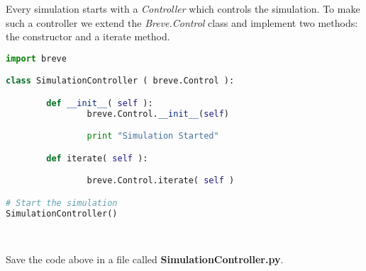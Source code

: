 
Every simulation starts with a \textit{Controller} which controls the simulation. To make such a controller we extend the \textit{Breve.Control} class and implement two methods: the constructor and a iterate method.

\begin{lstlisting}[language=Python]
import breve

class SimulationController ( breve.Control ):

        def __init__( self ):
                breve.Control.__init__(self)

                print "Simulation Started"

        def iterate( self ):

                breve.Control.iterate( self )

# Start the simulation
SimulationController()
\end{lstlisting}

\mbox{}\\\noindent

Save the code above in a file called \textbf{SimulationController.py}.